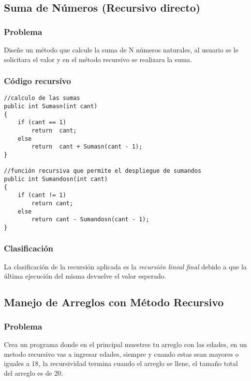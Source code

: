 \documentclass[letterpaper, 12pt]{article}
\begin{document}
\begin{justify}
        \subsection{Suma de Números (Recursivo directo)}
            \subsubsection{Problema}
            Diseñe un método que calcule la suma de N números naturales, al usuario se le solicitara el valor y en el método recursivo se realizara la suma.
            \subsubsection{Código recursívo}
\begin{verbatim}
//calculo de las sumas
public int Sumasn(int cant)
{
    if (cant == 1)
        return  cant;
    else
        return  cant + Sumasn(cant - 1);        
}

//función recursiva que permite el despliegue de sumandos
public int Sumandosn(int cant)
{
    if (cant != 1)
        return cant;
    else
        return cant - Sumandosn(cant - 1);
}    
\end{verbatim}
            \subsubsection{Clasificación}
            La clasificación de la recursión aplicada es la \emph{recursión lineal final} debido a que la última ejecución del misma devuelve el valor esperado.
        \subsection{Manejo de Arreglos con Método Recursivo}
            \subsubsection{Problema}
            Crea un programa donde en el principal muestres tu arreglo con las edades, en un metodo recursivo vas a ingresar edades, siempre y cuando estas sean mayores o 
            iguales a 18, la recursividad termina cuando el arreglo se llene, el tamaño total del arreglo es de 20.

\end{justify}
\end{document}
